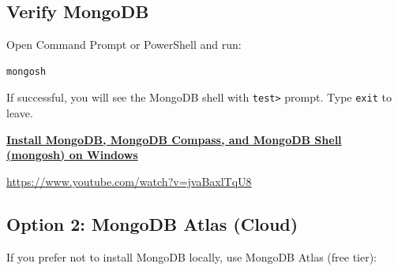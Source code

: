 \documentclass[12pt,a4paper]{article}
\begin{document}
\subsection{Verify MongoDB}

Open Command Prompt or PowerShell and run:

\begin{lstlisting}[language=bash, caption=Test MongoDB connection]
mongosh
\end{lstlisting}

If successful, you will see the MongoDB shell with \texttt{test>} prompt.
Type \texttt{exit} to leave.

\begin{tcolorbox}[colback=infobox,colframe=primaryblue,title= YouTube Tutorial]
    \href{https://www.youtube.com/watch?v=jvaBaxlTqU8}{\textbf{Install MongoDB, MongoDB Compass, and MongoDB Shell (mongosh) on Windows}}
    
    \url{https://www.youtube.com/watch?v=jvaBaxlTqU8}
\end{tcolorbox}

\subsection{Option 2: MongoDB Atlas (Cloud)}

If you prefer not to install MongoDB locally, use MongoDB Atlas (free tier):
\end{document}
